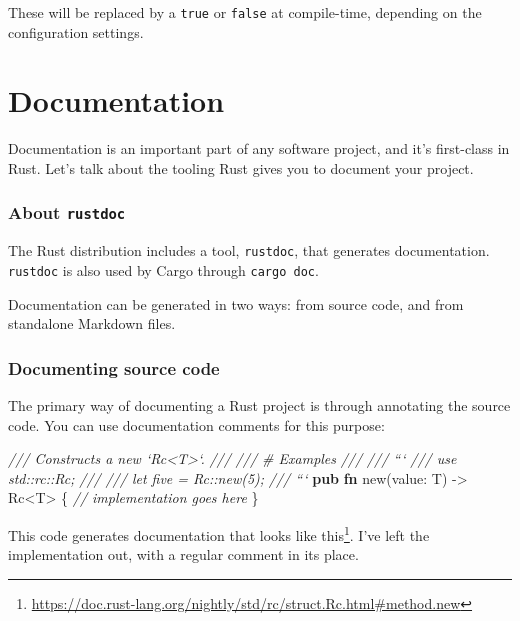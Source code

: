 \documentclass[a4paper,]{book}
\newenvironment{Shaded}{\begin{snugshade}}{\end{snugshade}}
\newcommand{\KeywordTok}[1]{\textcolor[rgb]{0.13,0.29,0.53}{\textbf{{#1}}}}
\newcommand{\CommentTok}[1]{\textcolor[rgb]{0.56,0.35,0.01}{\textit{{#1}}}}
\newcommand{\NormalTok}[1]{{#1}}
\renewcommand{\href}[2]{#2\footnote{\url{#1}}}
\begin{document}
These will be replaced by a \texttt{true} or \texttt{false} at
compile-time, depending on the configuration settings.

\hypertarget{sec--documentation}{\section{Documentation}\label{sec--documentation}}

Documentation is an important part of any software project, and it's
first-class in Rust. Let's talk about the tooling Rust gives you to
document your project.

\subsubsection{\texorpdfstring{About
\texttt{rustdoc}}{About rustdoc}}\label{about-rustdoc}

The Rust distribution includes a tool, \texttt{rustdoc}, that generates
documentation. \texttt{rustdoc} is also used by Cargo through
\texttt{cargo\ doc}.

Documentation can be generated in two ways: from source code, and from
standalone Markdown files.

\subsubsection{Documenting source code}\label{documenting-source-code}

The primary way of documenting a Rust project is through annotating the
source code. You can use documentation comments for this purpose:

\begin{Shaded}
\begin{Highlighting}[]
\CommentTok{/// Constructs a new `Rc<T>`.}
\CommentTok{///}
\CommentTok{/// # Examples}
\CommentTok{///}
\CommentTok{/// ```}
\CommentTok{/// use std::rc::Rc;}
\CommentTok{///}
\CommentTok{/// let five = Rc::new(5);}
\CommentTok{/// ```}
\KeywordTok{pub} \KeywordTok{fn} \NormalTok{new(value: T) -> Rc<T> \{}
    \CommentTok{// implementation goes here}
\NormalTok{\}}
\end{Highlighting}
\end{Shaded}

This code generates documentation that looks
\href{https://doc.rust-lang.org/nightly/std/rc/struct.Rc.html\#method.new}{like
this}. I've left the implementation out, with a regular comment in its
place.
\end{document}
